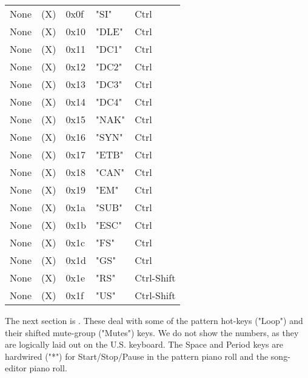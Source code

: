 \begin{table}[htb!]
\begin{tabular}{l l l l l}
        None               & (X)  &  0x0f   & "SI"         & Ctrl \\
        None               & (X)  &  0x10   & "DLE"        & Ctrl \\
        None               & (X)  &  0x11   & "DC1"        & Ctrl \\
        None               & (X)  &  0x12   & "DC2"        & Ctrl \\
        None               & (X)  &  0x13   & "DC3"        & Ctrl \\
        None               & (X)  &  0x14   & "DC4"        & Ctrl \\
        None               & (X)  &  0x15   & "NAK"        & Ctrl \\
        None               & (X)  &  0x16   & "SYN"        & Ctrl \\
        None               & (X)  &  0x17   & "ETB"        & Ctrl \\
        None               & (X)  &  0x18   & "CAN"        & Ctrl \\
        None               & (X)  &  0x19   & "EM"         & Ctrl \\
        None               & (X)  &  0x1a   & "SUB"        & Ctrl \\
        None               & (X)  &  0x1b   & "ESC"        & Ctrl \\
        None               & (X)  &  0x1c   & "FS"         & Ctrl \\
        None               & (X)  &  0x1d   & "GS"         & Ctrl \\
        None               & (X)  &  0x1e   & "RS"         & Ctrl-Shift \\
        None               & (X)  &  0x1f   & "US"         & Ctrl-Shift \\
      \end{tabular}
   \end{table}

   The next section is .
   These deal with some of the pattern hot-keys ("Loop")
   and their shifted mute-group ("Mutes") keys.
   We do not show the numbers, as they are logically laid out on the U.S.
   keyboard.
   The Space and Period keys are hardwired ("*")
   for Start/Stop/Pause in the pattern piano roll and the song-editor
   piano roll.

